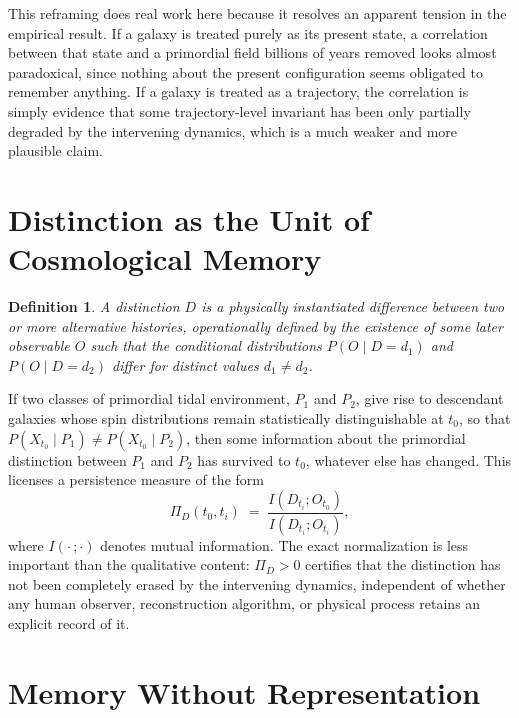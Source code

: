 \documentclass[11pt]{article}
\newtheorem{definition}{Definition}
\begin{document}
This reframing does real work here because it resolves an apparent tension in the empirical result. If a galaxy is treated purely as its present state, a correlation between that state and a primordial field billions of years removed looks almost paradoxical, since nothing about the present configuration seems obligated to remember anything. If a galaxy is treated as a trajectory, the correlation is simply evidence that some trajectory-level invariant has been only partially degraded by the intervening dynamics, which is a much weaker and more plausible claim.

\section{Distinction as the Unit of Cosmological Memory}

\begin{definition}
A distinction $D$ is a physically instantiated difference between two or more alternative histories, operationally defined by the existence of some later observable $O$ such that the conditional distributions $P(O \mid D = d_1)$ and $P(O \mid D = d_2)$ differ for distinct values $d_1 \neq d_2$.
\end{definition}

If two classes of primordial tidal environment, $P_1$ and $P_2$, give rise to descendant galaxies whose spin distributions remain statistically distinguishable at $t_0$, so that $P(X_{t_0} \mid P_1) \neq P(X_{t_0} \mid P_2)$, then some information about the primordial distinction between $P_1$ and $P_2$ has survived to $t_0$, whatever else has changed. This licenses a persistence measure of the form
\begin{equation}
\Pi_D(t_0, t_i) \;=\; \frac{I(D_{t_i}; O_{t_0})}{I(D_{t_i}; O_{t_i})},
\end{equation}
where $I(\cdot\,;\cdot)$ denotes mutual information. The exact normalization is less important than the qualitative content: $\Pi_D > 0$ certifies that the distinction has not been completely erased by the intervening dynamics, independent of whether any human observer, reconstruction algorithm, or physical process retains an explicit record of it.

\section{Memory Without Representation}
\end{document}
